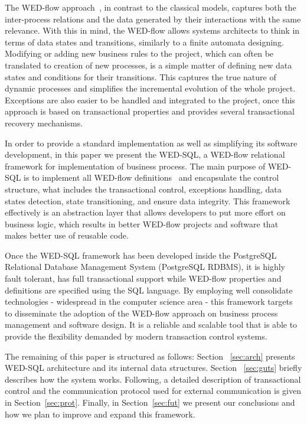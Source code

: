 \documentclass[12pt]{article}
\begin{document}
The WED-flow approach~\cite{ICWS12}, in contrast to the classical models, captures both the inter-process relations  and the data generated by their interactions with the same relevance. With this in mind, the WED-flow allows systems architects to think in terms of data states and transitions, similarly to a finite automata designing. Modifying or adding new business rules to the project, which can often be translated to creation of new processes, is a simple matter of defining new data states and conditions for their transitions. This captures the true nature of dynamic processes and simplifies the incremental evolution  of the whole project. Exceptions are also easier to be handled and integrated to the project, once this approach is based on transactional properties and provides several transactional recovery mechanisms.

 In order to provide a standard implementation as well as simplifying its software development, in this paper  we present  the WED-SQL, a WED-flow relational framework for implementation of business process. The main purpose of WED-SQL is to implement all WED-flow definitions~\cite{ICWS12} and encapsulate the control structure, what includes the transactional control, exceptions handling, data states detection, state transitioning,  and ensure data integrity. This framework effectively is an abstraction layer that allows developers to put more effort
on business logic, which results in better WED-flow projects and software that makes better use of reusable code. 

 Once the WED-SQL framework has been developed  inside the PostgreSQL~\cite{PSQL} Relational Database Management System (PostgreSQL RDBMS), it is highly fault tolerant, has full transactional support while WED-flow properties and definitions are specified using the SQL language. By employing well consolidate  technologies - widespread in the computer science area - this framework targets to disseminate the adoption of the WED-flow approach on business process management and software design. It is a reliable and scalable tool that is able to provide the flexibility demanded by modern transaction control systems. 

 The remaining of this paper is structured as follows: Section ~\ref{sec:arch} presents WED-SQL architecture and its internal data structures. Section ~\ref{sec:guts} briefly describes how the system works. Following, a detailed description of transactional control and the communication protocol used for external communication is given in Section~\ref{sec:prot}. Finally, in Section~\ref{sec:fut} we present our conclusions and how we plan to improve and expand this framework.  
\end{document}
